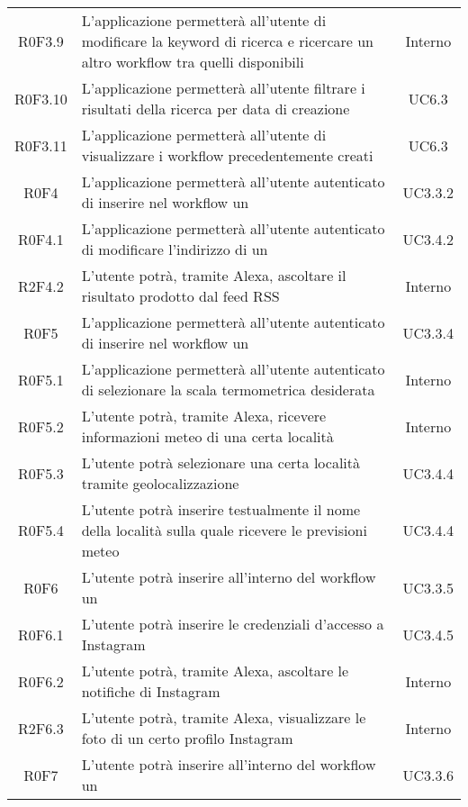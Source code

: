 \begin{center}
\begin{longtable}{cm{8cm}c }
	R0F3.9 & L'applicazione permetterà all'utente di modificare la keyword di ricerca e ricercare un altro workflow tra quelli disponibili &  Interno \\
	R0F3.10 & L'applicazione permetterà all'utente filtrare i risultati della ricerca per data di creazione &  UC6.3 \\
	R0F3.11 & L'applicazione permetterà all'utente di visualizzare i workflow precedentemente creati &  UC6.3 \\
	R0F4 & L'applicazione permetterà all'utente autenticato di inserire nel workflow un \BFeedRSS{} &  UC3.3.2 \\
	R0F4.1 & L'applicazione permetterà all'utente autenticato di modificare l'indirizzo di un \BFeedRSS{} &  UC3.4.2 \\
	R2F4.2 & L'utente potrà, tramite Alexa, ascoltare il risultato prodotto dal feed RSS & Interno \\
	R0F5 & L'applicazione permetterà all'utente autenticato di inserire nel workflow un \BMeteo{} &  UC3.3.4 \\
	R0F5.1 & L'applicazione permetterà all'utente autenticato di selezionare la scala termometrica desiderata & Interno \\
	R0F5.2 & L'utente potrà, tramite Alexa, ricevere informazioni meteo di una certa località  & Interno \\
	R0F5.3 & L'utente potrà selezionare una certa località tramite geolocalizzazione & UC3.4.4 \\
	R0F5.4 & L'utente potrà inserire testualmente il nome della località sulla quale ricevere le previsioni meteo & UC3.4.4 \\
	R0F6 & L'utente potrà inserire all'interno del workflow un \BInstagram{} & UC3.3.5 \\
	R0F6.1 & L'utente potrà inserire le credenziali d'accesso a Instagram & UC3.4.5 \\
	R0F6.2 & L'utente potrà, tramite Alexa, ascoltare le notifiche di Instagram & Interno \\
	R2F6.3 & L'utente potrà, tramite Alexa, visualizzare le foto di un certo profilo Instagram & Interno \\
	R0F7 & L'utente potrà inserire all'interno del workflow un \BFacebook{} & UC3.3.6 \\

\end{longtable}
\end{center}
